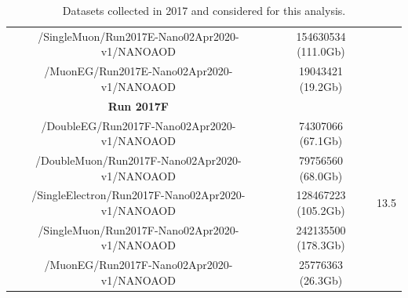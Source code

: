 \documentclass[a4paper, 10pt, openright]{report}
\begin{document}
\begin{appendices}
\begin{table}
\begin{center}
{\begin{tabular}{ c|c|c }
/SingleMuon/Run2017E-Nano02Apr2020-v1/NANOAOD & 154630534 (111.0Gb) & \\
/MuonEG/Run2017E-Nano02Apr2020-v1/NANOAOD & 19043421 (19.2Gb) & \\
 \hline
\textbf{Run 2017F} & & \\ 
/DoubleEG/Run2017F-Nano02Apr2020-v1/NANOAOD & 74307066 (67.1Gb) & \multirow{ 5}{*}{13.5} \\
/DoubleMuon/Run2017F-Nano02Apr2020-v1/NANOAOD & 79756560 (68.0Gb) & \\
/SingleElectron/Run2017F-Nano02Apr2020-v1/NANOAOD & 128467223 (105.2Gb) & \\
/SingleMuon/Run2017F-Nano02Apr2020-v1/NANOAOD & 242135500 (178.3Gb) \\
 /MuonEG/Run2017F-Nano02Apr2020-v1/NANOAOD & 25776363 (26.3Gb) & \\
 \hline
\end{tabular}
}
\caption{Datasets collected in 2017 and considered for this analysis.}
\label{table:Data2017}
\end{center}
\end{table}


\end{appendices}
\end{document}

